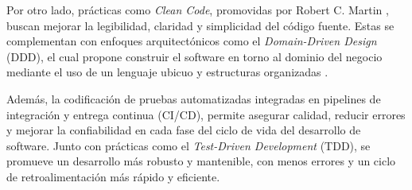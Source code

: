 Por otro lado, prácticas como \textit{Clean Code}, promovidas por Robert C. Martin \cite{Martin2008}, buscan mejorar la legibilidad, claridad y simplicidad del código fuente. Estas se complementan con enfoques arquitectónicos como el \textit{Domain-Driven Design} (DDD), el cual propone construir el software en torno al dominio del negocio mediante el uso de un lenguaje ubicuo y estructuras organizadas \cite{Evans2003}.

Además, la codificación de pruebas automatizadas integradas en pipelines de integración y entrega continua (CI/CD), permite asegurar calidad, reducir errores y mejorar la confiabilidad en cada fase del ciclo de vida del desarrollo de software. Junto con prácticas como el \textit{Test-Driven Development} (TDD), se promueve un desarrollo más robusto y mantenible, con menos errores y un ciclo de retroalimentación más rápido y eficiente.
